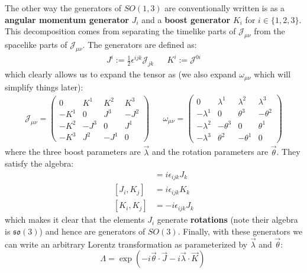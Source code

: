 \documentclass[11pt, oneside]{article}   	%
\theoremstyle{definition}
\begin{document}
The other way the generators of $SO(1, 3)$ are conventionally written is as a \textbf{angular momentum generator} $J_i$ and a \textbf{boost 
generator} $K_i$ for $i\in\{1, 2, 3\}$. This decomposition comes from separating the timelike parts of $\mathcal J_{\mu\nu}$ from the 
spacelike parts of $\mathcal J_{\mu\nu}$. The generators are defined as:
\begin{align}
	J^i := \frac{1}{2}\epsilon^{ijk}\mathcal J_{jk} && K^i := \mathcal J^{0i}
\end{align}
which clearly allows us to expand the tensor as (we also expand $\omega_{\mu\nu}$ which will simplify things later):
\begin{align}
	\mathcal J_{\mu\nu} = 
		\begin{pmatrix} 
			0 & K^1 & K^2 & K^3 \\ 
			-K^1 & 0 & J^3 & -J^2 \\
			-K^2 & -J^3 & 0 & J^1 \\
			-K^3 & J^2 & -J^1 & 0
		\end{pmatrix}
	&&
	\omega_{\mu\nu} = \begin{pmatrix}
		0 & \lambda^1 & \lambda^2 & \lambda^3 \\
		-\lambda^1 & 0 & \theta^3 & -\theta^2 \\
		-\lambda^2 & -\theta^3 & 0 & \theta^1 \\
		-\lambda^3 & \theta^2 & -\theta^1 & 0
	\end{pmatrix}
\end{align}
where the three boost parameters are $\vec\lambda$ and the rotation parameters are $\vec\theta$. They satisfy the algebra:
\begin{align}
	[J_i, J_j] &= i\epsilon_{ijk} J_k \nonumber\\
	[J_i, K_j] &= i\epsilon_{ijk} K_k \label{eq:lorentz_algebra} \\
	[K_i, K_j] &= -i\epsilon_{ijk} J_k\nonumber
\end{align}
which makes it clear that the elements $J_i$ generate \textbf{rotations} (note their algebra is $\mathfrak{so}(3)$) and hence are generators 
of $SO(3)$. Finally, with these generators we can write an arbitrary Lorentz transformation as parameterized by $\vec\lambda$ and 
$\vec\theta$:
\begin{equation}
	\Lambda = \exp\left(-i\vec\theta\cdot\vec J - i\vec\lambda\cdot\vec K\right)~
	\label{eq:lorentz_transformation}
\end{equation}
\end{document}
